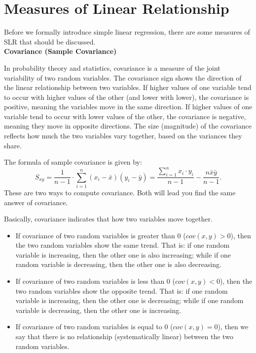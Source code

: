 \section{Measures of Linear Relationship}

Before we formally introduce simple linear regression, there are some measures of SLR that should be discussed.\\

\textbf{Covariance (Sample Covariance)}

In probability theory and statistics, covariance is a measure of the joint variability of two random variables. The covariance sign shows the direction of the linear relationship between two variables. If higher values of one variable tend to occur with higher values of the other (and lower with lower), the covariance is positive, meaning the variables move in the same direction. If higher values of one variable tend to occur with lower values of the other, the covariance is negative, meaning they move in opposite directions. The size (magnitude) of the covariance reflects how much the two variables vary together, based on the variances they share.

\begin{definition}
The formula of sample covariance is given by: \[ S_{xy} = \frac{1}{n-1} \cdot \sum_{i=1}^{n} (x_i - \bar{x})(y_i - \bar{y}) = \frac{\sum_{i = 1}^{n}x_i \cdot y_i}{n -1} - \frac{n\bar{x}\bar{y}}{n-1}.\]
These are two ways to compute covariance. Both will lead you find the same answer of covariance.
\end{definition}

Basically, covariance indicates that how two variables move together.

\begin{itemize}
	\item If covariance of two random variables is greater than $0$ ($cov(x,y) > 0$), then the two random variables show the same trend. That is: if one random variable is increasing, then the other one is also increasing; while if one random variable is decreasing, then the other one is also decreasing.
	\item If covariance of two random variables is less than $0$ ($cov(x,y) < 0$), then the two random variables show the opposite trend. That is: if one random variable is increasing, then the other one is decreasing; while if one random variable is decreasing, then the other one is increasing.
	\item If covariance of two random variables is equal to $0$ ($cov(x,y) = 0$), then we say that there is no relationship (systematically linear) between the two random variables.
\end{itemize}

